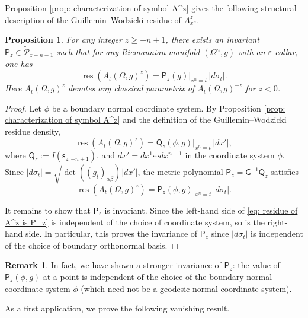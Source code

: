 \documentclass[11pt]{amsart}
\newcommand*{\res}{\operatorname{res}}
\newtheorem{proposition}[theorem]{Proposition}
\theoremstyle{definition}
\newtheorem{remark}{Remark}[section]
\numberwithin{equation}{section}
\begin{document}
Proposition \ref{prop: characterization of symbol A^z} gives the following structural description of the Guillemin--Wodzicki residue of $A_{x^n}^z$.

\begin{proposition}\label{prop: structure of residue}
    For any integer $z\ge-n+1$, there exists an invariant $\mathsf P_z\in\widetilde{\mathcal P}_{z+n-1}$ such that for any Riemannian manifold $(\Omega^n,g)$ with an $\varepsilon$-collar, one has
    \[\res\left(A_{t}(\Omega,g)^z\right) = \mathsf P_z(g)\big|_{x^n=t}\,  |d\sigma_{t}|.\]
    Here $A_{t}(\Omega,g)^z$ denotes any classical parametrix of $A_{t}(\Omega,g)^{-z}$ for $z<0$.
\end{proposition}
\begin{proof}
    Let $\phi$ be a boundary normal coordinate system. By Proposition \ref{prop: characterization of symbol A^z} and the definition of the Guillemin--Wodzicki residue density,
    \begin{equation*}
        \res\left(A_{t}(\Omega,g)^z\right) = \mathsf Q_z(\phi,g)\big|_{x^n=t}\, |dx'|,
    \end{equation*}
    where $\mathsf Q_z := I(\mathsf s_{z,-n+1})$, and $dx'=dx^1 \cdots dx^{n-1}$ in the coordinate system $\phi$. Since $|d\sigma_t|= \sqrt{\det(( g_t)_{\alpha\beta})}|dx'|$, the metric polynomial $\mathsf P_z = \mathsf G^{-1}\mathsf Q_z$ satisfies
    \begin{equation}
        \label{eq: residue of A^z is P_z}
        \res\left(A_{t}(\Omega,g)^z\right) = \mathsf P_z(\phi,g)\big|_{x^n=t}\, |d\sigma_t|.
    \end{equation}
    
    It remains to show that $\mathsf P_{z}$ is invariant. Since the left-hand side of \eqref{eq: residue of A^z is P_z} is independent of the choice of coordinate system, so is the right-hand side. In particular, this proves the invariance of $\mathsf P_z$ since $|d\sigma_t|$ is independent of the choice of boundary orthonormal basis.  
\end{proof}
\begin{remark}
    \label{rmk: strong invariance}
    In fact, we have shown a stronger invariance of $\mathsf P_z$: the value of $\mathsf P_z(\phi,g)$ at a point is independent of the choice of the  boundary normal coordinate system $\phi$ (which need not be a geodesic normal coordinate system).
\end{remark}


As a first application, we prove the following vanishing result.
\end{document}

